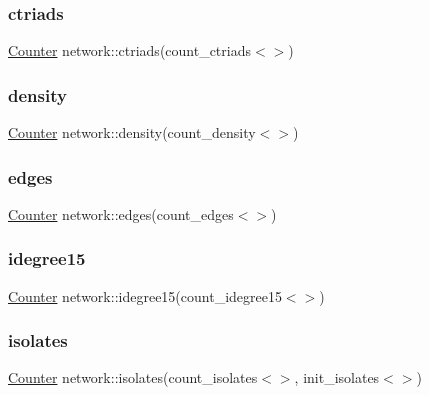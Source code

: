 \subsubsection{\texorpdfstring{ctriads}{ctriads}}
{\footnotesize\ttfamily \hyperlink{class_counter}{Counter} network\+::ctriads(count\+\_\+ctriads$<$$>$)}

\mbox{\label{namespacenetwork_a0a7973963f42fa84d8ad03f072084f97}} 
\subsubsection{\texorpdfstring{density}{density}}
{\footnotesize\ttfamily \hyperlink{class_counter}{Counter} network\+::density(count\+\_\+density$<$$>$)}

\mbox{\label{namespacenetwork_a7a0da6f5fe0074f5e85bd1ba47be8dd3}} 
\subsubsection{\texorpdfstring{edges}{edges}}
{\footnotesize\ttfamily \hyperlink{class_counter}{Counter} network\+::edges(count\+\_\+edges$<$$>$)}

\mbox{\label{namespacenetwork_a34a34c9d4268fc69f8a6b3bd85d04cb9}} 
\subsubsection{\texorpdfstring{idegree15}{idegree15}}
{\footnotesize\ttfamily \hyperlink{class_counter}{Counter} network\+::idegree15(count\+\_\+idegree15$<$$>$)}

\mbox{\label{namespacenetwork_aeb04b242d2e5a69e7d9bfd2f32942e84}} 
\subsubsection{\texorpdfstring{isolates}{isolates}}
{\footnotesize\ttfamily \hyperlink{class_counter}{Counter} network\+::isolates(count\+\_\+isolates$<$$>$, init\+\_\+isolates$<$$>$)}


